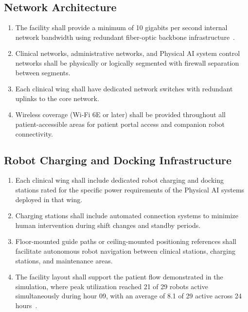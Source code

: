 \documentclass[11pt,letterpaper]{article}
\begin{document}
\subsection{Network Architecture}

\begin{enumerate}[label=(\alph*)]
\item The facility shall provide a minimum of 10 gigabits per second internal
  network bandwidth using redundant fiber-optic backbone
  infrastructure~\cite{sitespec2026}.

\item Clinical networks, administrative networks, and Physical AI system control
  networks shall be physically or logically segmented with firewall separation
  between segments.

\item Each clinical wing shall have dedicated network switches with redundant
  uplinks to the core network.

\item Wireless coverage (Wi-Fi 6E or later) shall be provided throughout all
  patient-accessible areas for patient portal access and companion robot
  connectivity.
\end{enumerate}

\subsection{Robot Charging and Docking Infrastructure}

\begin{enumerate}[label=(\alph*)]
\item Each clinical wing shall include dedicated robot charging and docking
  stations rated for the specific power requirements of the Physical AI
  systems deployed in that wing.

\item Charging stations shall include automated connection systems to minimize
  human intervention during shift changes and standby periods.

\item Floor-mounted guide paths or ceiling-mounted positioning references shall
  facilitate autonomous robot navigation between clinical stations, charging
  stations, and maintenance areas.

\item The facility layout shall support the patient flow demonstrated in the
  simulation, where peak utilization reached 21 of 29 robots active
  simultaneously during hour 09, with an average of 8.1 of 29 active across
  24 hours~\cite{newtrial2026}.
\end{enumerate}
\end{document}

